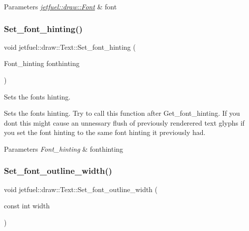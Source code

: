 \begin{DoxyParams}{Parameters}
{\em \hyperlink{classjetfuel_1_1draw_1_1Font}{jetfuel\+::draw\+::\+Font}} & font \\
\hline
\end{DoxyParams}
\mbox{\label{classjetfuel_1_1draw_1_1Text_ada69de19f3ea2373120e37f9f61eeb6d}} 
\subsubsection{\texorpdfstring{Set\+\_\+font\+\_\+hinting()}{Set\_font\_hinting()}}
{\footnotesize\ttfamily void jetfuel\+::draw\+::\+Text\+::\+Set\+\_\+font\+\_\+hinting (\begin{DoxyParamCaption}\item[{Font\+\_\+hinting}]{fonthinting }\end{DoxyParamCaption})\hspace{0.3cm}{\ttfamily [inline]}}



Sets the font\textquotesingle{}s hinting. 

Sets the font\textquotesingle{}s hinting. Try to call this function after Get\+\_\+font\+\_\+hinting. If you don\textquotesingle{}t this might cause an unnessary flush of previously renderered text glyphs if you set the font hinting to the same font hinting it previously had.


\begin{DoxyParams}{Parameters}
{\em Font\+\_\+hinting} & fonthinting \\
\hline
\end{DoxyParams}
\mbox{\label{classjetfuel_1_1draw_1_1Text_ab8b3959fd37cb3cf9fd919ccdcaa09f3}} 
\subsubsection{\texorpdfstring{Set\+\_\+font\+\_\+outline\+\_\+width()}{Set\_font\_outline\_width()}}
{\footnotesize\ttfamily void jetfuel\+::draw\+::\+Text\+::\+Set\+\_\+font\+\_\+outline\+\_\+width (\begin{DoxyParamCaption}\item[{const int}]{width }\end{DoxyParamCaption})\hspace{0.3cm}{\ttfamily [inline]}}



